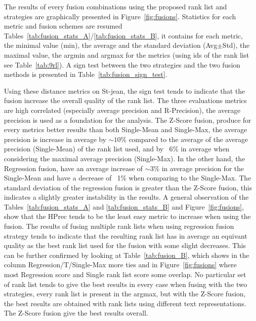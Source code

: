 The results of every fusion combinations using the proposed rank list and strategies are graphically presented in Figure~\ref{fig:fusions}.
Statistics for each metric and fusion schemes are resumed Tables~\ref{tab:fusion_stats_A}/\ref{tab:fusion_stats_B}, it contains for each metric, the minimal value (min), the average and the standard deviation (Avg$\pm$Std), the maximal value, the argmin and argmax for the metrics (using ids of the rank list see Table~\ref{tab:9rl}).
A sign test between the two strategies and the two fusion methods is presented in Table~\ref{tab:fusion_sign_test}.

Using these distance metrics on St-jean, the sign test tends to indicate that the fusion increase the overall quality of the rank list.
The three evaluations metrics are high correlated (especially average precision and R-Precision), the average precision is used as a foundation for the analysis.
The Z-Score fusion, produce for every metrics better results than both Single-Mean and Single-Max, the average precision is increase in average by $\sim 10$\% compared to the average of the average precision (Single-Mean) of the rank list used, and by ~6\% in average when considering the maximal average precision (Single-Max).
In the other hand, the Regression fusion, have an average increase of $\sim 3$\% in average precision for the Single-Mean and have a decrease of ~1\% when comparing to the Single-Max.
The standard deviation of the regression fusion is greater than the Z-Score fusion, this indicates a slightly greater instability in the results.
A general observation of the Tables~\ref{tab:fusion_stats_A} and \ref{tab:fusion_stats_B} and Figure~\ref{fig:fusions}, show that the HPrec tends to be the least easy metric to increase when using the fusion.
The results of fusing multiple rank lists when using regression fusion strategy tends to indicate that the resulting rank list has in average an equivant quality as the best rank list used for the fusion with some slight decreases.
This can be further confirmed by looking at Table~\ref{tab:fusion_B}, which shows in the column Regression/T/Single-Max more ties and in Figure~\ref{fig:fusions} where most Regression score and Single rank list score some overlap.
No particular set of rank list tends to give the best results in every case when fusing with the two strategies, every rank list is present in the argmax, but with the Z-Score fusion, the best results are obtained with rank lists using different text representations.
The Z-Score fusion give the best results overall.

